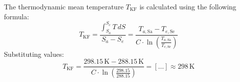 The thermodynamic mean temperature \( T_{\text{KF}} \) is calculated using the following formula:  
\[
T_{\text{KF}} = \frac{\int_{S_a}^{S_e} T \, dS}{S_a - S_e} = \frac{T_{a,\text{Sa}} - T_{e,\text{Se}}}{C \cdot \ln \left( \frac{T_{a,\text{Sa}}}{T_{e,\text{Se}}} \right)}
\]  
Substituting values:  
\[
T_{\text{KF}} = \frac{298.15 \, \text{K} - 288.15 \, \text{K}}{C \cdot \ln \left( \frac{298.15}{288.15} \right)} = [\ldots] \approx 298 \, \text{K}
\]